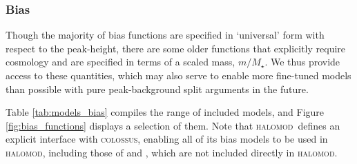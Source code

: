 \documentclass[5p,aas_macros]{elsarticle}
\newcommand{\halomod}{\textsc{halomod}}
\newcommand{\bd}[1]{\textcolor{purple}{\textbf{[BD: #1]}}}
\begin{document}


\subsubsection{Bias}
\label{sec:halomod:components:bias}
Though the majority of bias functions are specified in `universal' form with respect to the peak-height, there are some older functions that explicitly require cosmology and are specified in terms of a scaled mass, $m/M_\star$. We thus provide access to these quantities, which may also serve to enable more fine-tuned models than possible with pure peak-background split arguments in the future. 

Table \ref{tab:models_bias} compiles the range of included models, and Figure \ref{fig:bias_functions} displays a selection of them.
Note that \halomod\ defines an explicit interface with \textsc{colossus}, enabling all of its bias models to be used in \halomod, including those of \cite{Bhattacharya2011} and \cite{Comparat2017}, which are not included directly in \halomod.

\end{document}
